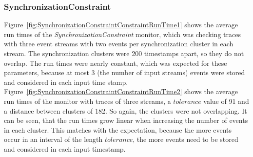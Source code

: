 \subsubsection{SynchronizationConstraint}
Figure~\ref{fig:SynchronizationConstraintConstraintRunTime1} shows the average run times of the \textit{SynchronizationConstraint} monitor, which was checking traces with three event streams with two events per synchronization cluster in each stream. The synchronization clusters were 200 timestamps apart, so they do not overlap. The run times were nearly constant, which was expected for these parameters, because at most 3 (the number of input streams) events were stored and considered in each input time stamp.\\
Figure~\ref{fig:SynchronizationConstraintConstraintRunTime2} shows the average run times of the monitor with traces of three streams, a $tolerance$ value of 91 and a distance between clusters of 182. So again, the clusters were not overlapping. It can be seen, that the run times grow linear when increasing the number of events in each cluster. This matches with the expectation, because the more events occur in an interval of the length $tolerance$, the more events need to be stored and considered in each input timestamp.
